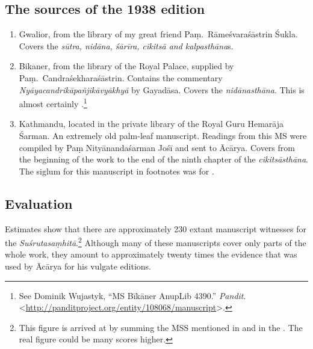 %
\subsection{The sources of the 1938 edition}
\begin{enumerate}
    \item [1]  Gwalior, from the library of my great friend Paṃ.\ Rāmeśvaraśāstrin 
    Śukla. 
    Covers the \emph{sūtra, nidāna, śārīra, cikitsā and kalpasthāna}s.
    
    \item[2] Bikaner, from the library of the Royal Palace, supplied by Paṃ.\ 
    Candraśekharaśāstrin. Contains the commentary 
    \emph{Nyāyacandrikāpañjikāvyākhyā} by Gayadāsa.  Covers the 
    \emph{nidānasthāna}.      
    This is almost certainly .\footnote{See Dominik Wujastyk, “MS Bīkāner AnupLib 4390.” 
    \emph{Pandit}. 
    <\url{http://panditproject.org/entity/108068/manuscript}>.}
    
    \item [3] Kathmandu, located in the private library of the Royal Guru Hemarāja 
    Śarman.  An extremely old palm-leaf manuscript. Readings from this MS were 
    compiled by Paṃ Nityānandaśarman Jośī and sent to Ācārya. Covers from the 
    beginning of the work to the end of the ninth chapter of the 
    \emph{cikitsāsthāna}.  The 
    siglum for this manuscript in footnotes was  for 
    . 
\end{enumerate}
\subsection{Evaluation}

Estimates show that there are approximately 230 extant manuscript
witnesses for the \emph{Suśrutasaṃhitā}.\footnote{This figure is arrived
at by summing the MSS mentioned in \cite{ncc} and in the \cite{ngmcp}. The
real figure could be many scores higher.}  Although many of these manuscripts cover only
parts of the whole work, they amount to approximately twenty times the evidence that was 
used by Ācārya for his vulgate editions.

